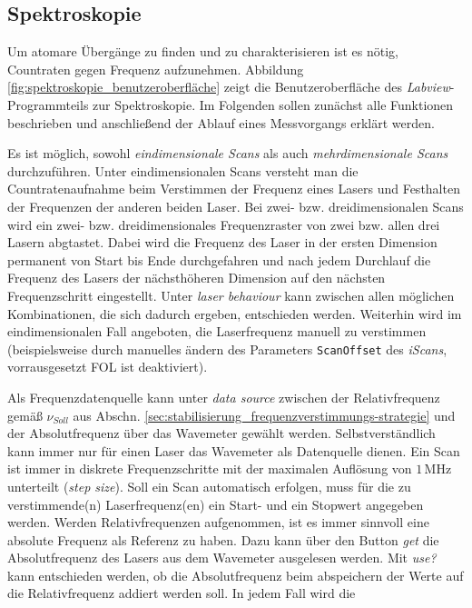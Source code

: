 \subsection{Spektroskopie}\label{subsec:spektroskopie_software}
Um atomare Übergänge zu finden und zu charakterisieren ist es nötig, Countraten
gegen Frequenz aufzunehmen. Abbildung \ref{fig:spektroskopie_benutzeroberfläche}
zeigt die Benutzeroberfläche des \textit{Labview}-Programmteils zur
Spektroskopie.
Im Folgenden sollen zunächst alle Funktionen beschrieben und
anschließend der Ablauf eines Messvorgangs erklärt werden.\par
Es ist möglich, sowohl \textit{eindimensionale Scans} als auch
\textit{mehrdimensionale Scans} durchzuführen. Unter eindimensionalen Scans
versteht man die Countratenaufnahme beim Verstimmen der Frequenz eines Lasers
und Festhalten der Frequenzen der anderen beiden Laser. Bei zwei- bzw.
dreidimensionalen Scans wird ein zwei- bzw. dreidimensionales Frequenzraster von
zwei bzw. allen drei Lasern abgtastet. Dabei wird die Frequenz des Laser in der
ersten Dimension permanent von Start bis Ende durchgefahren und nach jedem
Durchlauf die Frequenz des Lasers der nächsthöheren Dimension auf den nächsten
Frequenzschritt eingestellt. Unter \textit{laser behaviour} kann zwischen
allen möglichen Kombinationen, die sich dadurch ergeben, entschieden werden.
Weiterhin wird im eindimensionalen Fall angeboten, die Laserfrequenz manuell zu
verstimmen (beispielsweise durch manuelles
ändern des Parameters \lstinline|ScanOffset| des \textit{iScans}, 
vorrausgesetzt FOL ist deaktiviert).\par
Als Frequenzdatenquelle kann unter \textit{data
source} zwischen der Relativfrequenz gemäß
$\nu_{Soll}$ aus Abschn. \ref{sec:stabilisierung_frequenzverstimmungs-strategie}
und der Absolutfrequenz über das Wavemeter gewählt werden. Selbstverständlich
kann immer nur für einen Laser das Wavemeter als Datenquelle dienen. Ein Scan ist immer in
diskrete Frequenzschritte mit der maximalen Auflösung von $1\,$MHz unterteilt
(\textit{step size}). Soll ein Scan automatisch erfolgen, muss für die zu
verstimmende(n) Laserfrequenz(en) ein Start- und ein Stopwert angegeben werden.
Werden Relativfrequenzen aufgenommen, ist es immer sinnvoll eine absolute
Frequenz als Referenz zu haben. Dazu kann über den Button \textit{get} die
Absolutfrequenz des Lasers aus dem Wavemeter ausgelesen werden. Mit
\textit{use?} kann entschieden werden, ob die Absolutfrequenz beim abspeichern
der Werte auf die Relativfrequenz addiert werden soll. In jedem Fall wird die
